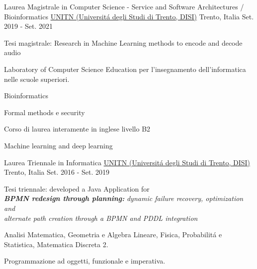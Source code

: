 

\begin{cventries}


  \cventry
    {Laurea Magistrale in Computer Science - Service and Software Architectures / Bioinformatics} %
    {\href{https://www.unitn.it/}{UNITN (Universit\'a degli Studi di Trento, DISI)}}  %
    {Trento, Italia} %
    {Set. 2019 - Set. 2021} %
    {
      \begin{cvitems} %
        \item {Tesi magistrale: Research in Machine Learning methods to encode and decode audio}
        \item {Laboratory of Computer Science Education per l'insegnamento dell'informatica nelle scuole superiori.}
        \item {Bioinformatics}
        \item {Formal methods e security}
        \item {Corso di laurea interamente in inglese livello B2}
        \item {Machine learning and deep learning}
      \end{cvitems}
    }

  \cventry
    {Laurea Triennale in Informatica} %
    {\href{https://www.unitn.it/}{UNITN (Universit\'a degli Studi di Trento, DISI)}}  %
    {Trento, Italia} %
    {Set. 2016 - Set. 2019} %
    {
      \begin{cvitems} %
        \item {Tesi triennale: developed a Java Application for \\ \textbf{\textit{BPMN redesign through planning:}} \textit{dynamic failure recovery, optimization and} \\ \textit{alternate path creation through a BPMN and PDDL integration}}
        \item Analisi Matematica, Geometria e Algebra Lineare, Fisica, Probabilit\'a e Statistica, Matematica Discreta 2.
        \item Programmazione ad oggetti, funzionale e imperativa.
      \end{cvitems}
    }


\end{cventries}
